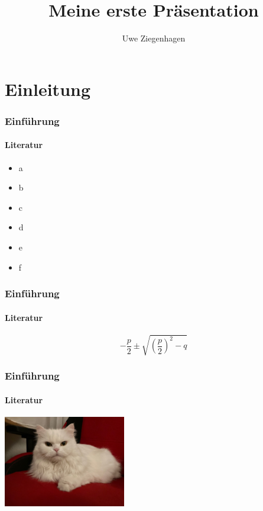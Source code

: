 \documentclass[ngerman]{beamer}
\author{Uwe Ziegenhagen}
\title{Meine erste Präsentation}
\institute{DANTE e.V. Heidelberg}
\begin{document}
\begin{frame}

\maketitle


\end{frame}

\begin{frame}

\tableofcontents

\end{frame}



\section{Einleitung}

\begin{frame}
\frametitle{Einführung}
\framesubtitle{Literatur}

\begin{itemize}
	\item a
	\item b
	\item c
	\item d
	\item e
	\item f
\end{itemize}

\end{frame}

\begin{frame}
\frametitle{Einführung}
\framesubtitle{Literatur}


{\huge
\begin{equation}
-\frac{p}{2} \pm \sqrt{ \left( \frac{p}{2} \right)^2 - q }
\end{equation}}

\end{frame}

\begin{frame}
\frametitle{Einführung}
\framesubtitle{Literatur}

\begin{center}
\includegraphics[width=0.4\textwidth,angle=40]{Bilder/Katze2}
\end{center}

\end{frame}
\end{document}
